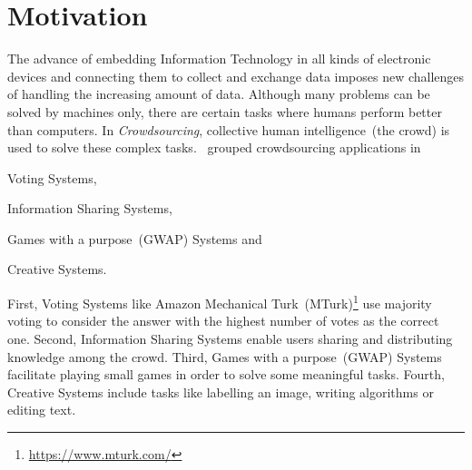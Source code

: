 \section{Motivation}
The advance of embedding Information Technology in all kinds of electronic devices and connecting them to collect and exchange data imposes new challenges of handling the increasing amount of data. Although many problems can be solved by machines only, there are certain tasks where humans perform better than computers. In \emph{Crowdsourcing}, collective human intelligence~(the crowd) is used to solve these complex tasks. \cite{yuen2011}~grouped crowdsourcing applications in 
\begin{inparaenum}[1)]
		\item Voting Systems,
		\item Information Sharing Systems,
		\item Games with a purpose~(GWAP) Systems and
		\item Creative Systems.
\end{inparaenum} 
First, Voting Systems like Amazon Mechanical Turk~(MTurk)\footnote{\url{https://www.mturk.com/}} use majority voting to consider the answer with the highest number of votes as the correct one. Second, Information Sharing Systems enable users sharing and distributing knowledge among the crowd. Third, Games with a purpose~(GWAP) Systems facilitate playing small games in order to solve some meaningful tasks. Fourth, Creative Systems include tasks like labelling an image, writing algorithms or editing text. 

